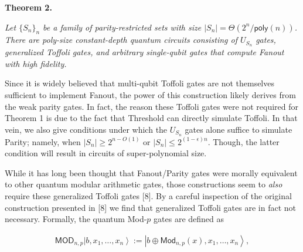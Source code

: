 \par\medskip\noindent\textbf{
\textbf{Theorem 2}\textbf{.}
}\par



\emph{Let $\{S_{n}\}_{n}$ be a family of parity-restricted sets with size $|S_{n}|=\Theta(2^{n}/{\mathsf{poly}}(n))$. There are poly-size constant-depth quantum circuits consisting of $U_{S_{n}}$ gates, generalized Toffoli gates, and arbitrary single-qubit gates that compute Fanout with high fidelity.}\par






Since it is widely believed that multi-qubit Toffoli gates are not themselves sufficient to implement Fanout, the power of this construction likely derives from the weak parity gates. In fact, the reason these Toffoli gates were not required for Theorem 1 is due to the fact that Threshold can directly simulate Toffoli. In that vein, we also give conditions under which the $U_{S_{n}}$ gates alone suffice to simulate Parity; namely, when $|S_{n}|\geq 2^{n-O(1)}$ or $|S_{n}|\leq 2^{(1-\epsilon)n}$. Though, the latter condition will result in circuits of super-polynomial size.\par




While it has long been thought that Fanout/Parity gates were morally equivalent to other quantum modular arithmetic gates, those constructions seem to \emph{also} require these generalized Toffoli gates [8]. By a careful inspection of the original construction presented in [8] we find that generalized Toffoli gates are in fact not necessary. Formally, the quantum Mod-$p$ gates are defined as\par


\[\begin{gathered}
\mathsf{MOD}_{n,p}\left|b,x_{1},\ldots,x_{n}\right\rangle:=\left|b\oplus{\mathsf{Mod}}_{n,p}(x),x_{1},\ldots,x_{n}\right\rangle,
\end{gathered}\]


